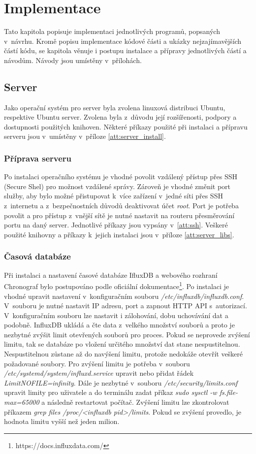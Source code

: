 \chapter{Implementace}\label{kap:implementation}
Tato kapitola popisuje implementaci jednotlivých programů, popsaných v~návrhu. Kromě popisu implementace kódové části a ukázky nejzajímavějších částí kódu, se kapitola věnuje i postupu instalace a přípravy jednotlivých částí a návodům. Návody jsou umístěny v~přílohách.

\section{Server}
Jako operační systém pro server byla zvolena linuxová distribuci Ubuntu, respektive Ubuntu server. Zvolena byla z~důvodu její rozšířenosti, podpory a dostupnosti použitých knihoven. Některé příkazy použité při instalaci a přípravu serveru jsou v~umístěny v~příloze \ref{att:server_install}. 

\subsection{Příprava serveru}
Po instalaci operačního systému je vhodné povolit vzdálený přístup přes SSH (Secure Shel) pro možnost vzdálené správy. Zároveň je vhodné změnit port služby, aby bylo možné přistupovat k~více zařízení v~jedné síti přes SSH z~internetu a z~bezpečnostních důvodů deaktivovat účet \textit{root}. Port je potřeba povolit a pro přístup z~vnější sítě je nutné nastavit na routeru přesměrování portu na daný server. Jednotlivé příkazy jsou vypsány v~\ref{att:ssh}. Veškeré použité knihovny a příkazy k~jejich instalaci jsou v~příloze \ref{att:server_libs}.

\subsection{Časová databáze}
Při instalaci a nastavení časové databáze IfluxDB a webového rozhraní Chronograf bylo postupováno podle oficiální dokumentace\footnote{https://docs.influxdata.com/}. Po instalaci je vhodné upravit nastavení v~konfiguračním souboru \textit{/etc/influxdb/influxdb.conf}. V~souboru je nutné nastavit IP adresu, port a zapnout HTTP API s~autorizací. V~konfiguračním souboru lze nastavit i zálohování, dobu uchovávání dat a podobně. InfluxDB ukládá a čte data z~velkého množství souborů a proto je nezbytné zvýšit limit otevřených souborů pro proces. Pokud se neprovede zvýšení limitu, tak se databáze po vložení určitého množství dat stane nespustitelnou. Nespustitelnou zůstane až do navýšení limitu, protože nedokáže otevřít veškeré požadované soubory. Pro zvýšení limitu je potřeba v~souboru \textit{/etc/systemd/system/influxd.service} upravit nebo přidat řádek \textit{LimitNOFILE=infinity}. Dále je nezbytné v~souboru \textit{/etc/security/limits.conf} upravit limity pro uživatele a do terminálu zadat příkaz \textit{sudo sysctl -w fs.file-max=65000} a následně restartovat počítač.  Zvýšení limitu lze zkontrolovat příkazem \textit{grep files /proc/<influxdb pid>/limits}. Pokud se zvýšení provedlo, je hodnota limitu vyšší než jeden milion.

